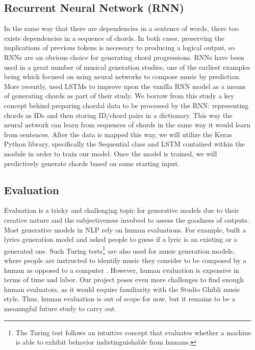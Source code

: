 \documentclass[11pt,a4paper]{article}
\begin{document}
\subsection{Recurrent Neural Network (RNN)}
In the same way that there are dependencies in a sentence of words, there too exists dependencies in a sequence of chords. In both cases, preserving the implications of previous tokens is necessary to producing a logical output, so RNNs are an obvious choice for generating chord progressions. RNNs have been used in a great number of musical generation studies, one of the earliest examples being \citet{mozer1994} which focused on using neural networks to compose music by prediction. More recently, \citet{brunner2017} used LSTMs to improve upon the vanilla RNN model as a means of generating chords as part of their study. We borrow from this study a key concept behind preparing chordal data to be processed by the RNN: representing chords as IDs and then storing ID/chord pairs in a dictionary. This way the neural network can learn from sequences of chords in the same way it would learn from sentences. After the data is mapped this way, we will utilize the Keras Python library, specifically the Sequential class and LSTM contained within the module in order to train our model. Once the model is trained, we will predictively generate chords based on some starting input. 

\subsection{Evaluation}
Evaluation is a tricky and challenging topic for generative models due to their creative nature and the subjectiveness involved to assess the goodness of outputs. Most generative models in NLP rely on human evaluations. For example, \citet{pudaruth2014} built a lyrics generation model and asked people to guess if a lyric is an existing or a generated one. Such Turing tests\footnote{The Turing test follows an intuitive concept that evaluates whether a machine is able to exhibit behavior indistinguishable from humans.} are also used for music generation models, where people are instructed to identify music they consider to be composed by a human as opposed to a computer \citep{ariza2009, yang2020}. However, human evaluation is expensive in terms of time and labor. Our project poses even more challenges to find enough human evaluators, as it would require familiarity with the Studio Ghibli music style. Thus, human evaluation is out of scope for now, but it remains to be a meaningful future study to carry out.
	
\end{document}
